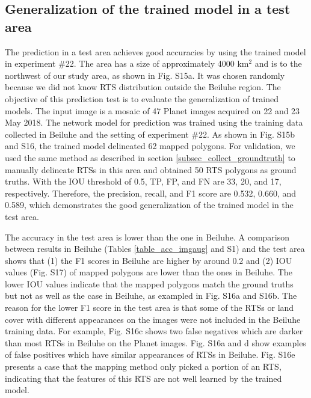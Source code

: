 \documentclass[authoryear,preprint,review,12pt]{elsarticle}
\begin{document}
\subsection{Generalization of the trained model in a test area}
\label{subsec_newArea}

The prediction in a test area achieves good accuracies by using the trained model in experiment \#22. 
The area has a size of approximately 4000 km$^2$ and is to the northwest of our study area, as shown in Fig. S15a. 
It was chosen randomly because we did not know RTS distribution outside the Beiluhe region. 
The objective of this prediction test is to evaluate the generalization of trained models. 
The input image is a mosaic of 47 Planet images acquired on 22 and 23 May 2018. 
The network model for prediction was trained using the training data collected in Beiluhe and the setting of experiment \#22. 
As shown in Fig. S15b and S16, the trained model delineated 62 mapped polygons. 
For validation, we used the same method as described in section \ref{subsec_collect_groundtruth} to manually delineate RTSs in this area and obtained 50 RTS polygons as ground truths. 
With the IOU threshold of 0.5, TP, FP, and FN are 33, 20, and 17, respectively. 
Therefore, the precision, recall, and F1 score are 0.532, 0.660, and 0.589, which demonstrates the good generalization of the trained model in the test area.

The accuracy in the test area is lower than the one in Beiluhe. 
A comparison between results in Beiluhe (Tables \ref{table_acc_imgaug} and S1) and the test area shows that (1) the F1 scores in Beiluhe are higher by around 0.2 and (2) IOU values (Fig. S17) of mapped polygons are lower than the ones in Beiluhe. 
The lower IOU values indicate that the mapped polygons match the ground truths but not as well as the case in Beiluhe, as exampled in Fig. S16a and S16b. 
The reason for the lower F1 score in the test area is that some of the RTSs or land cover with different appearances on the images were not included in the Beiluhe training data. 
For example, Fig. S16c shows two false negatives which are darker than most RTSs in Beiluhe on the Planet images. 
Fig. S16a and d show examples of false positives which have similar appearances of RTSs in Beiluhe. 
Fig. S16e presents a case that the mapping method only picked a portion of an RTS, indicating that the features of this RTS are not well learned by the trained model.

\end{document}
